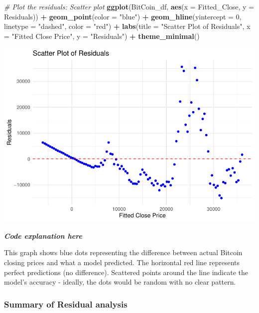 \documentclass[
]{book}
\newenvironment{Shaded}{\begin{snugshade}}{\end{snugshade}}
\newcommand{\AttributeTok}[1]{\textcolor[rgb]{0.13,0.29,0.53}{#1}}
\newcommand{\CommentTok}[1]{\textcolor[rgb]{0.56,0.35,0.01}{\textit{#1}}}
\newcommand{\DecValTok}[1]{\textcolor[rgb]{0.00,0.00,0.81}{#1}}
\newcommand{\FunctionTok}[1]{\textcolor[rgb]{0.13,0.29,0.53}{\textbf{#1}}}
\newcommand{\NormalTok}[1]{#1}
\newcommand{\SpecialCharTok}[1]{\textcolor[rgb]{0.81,0.36,0.00}{\textbf{#1}}}
\newcommand{\StringTok}[1]{\textcolor[rgb]{0.31,0.60,0.02}{#1}}
\begin{document}
\begin{Shaded}
\begin{Highlighting}[]
\CommentTok{\# Plot the residuals: Scatter plot}
\FunctionTok{ggplot}\NormalTok{(BitCoin\_df, }\FunctionTok{aes}\NormalTok{(}\AttributeTok{x =}\NormalTok{ Fitted\_Close, }\AttributeTok{y =}\NormalTok{ Residuals)) }\SpecialCharTok{+}
  \FunctionTok{geom\_point}\NormalTok{(}\AttributeTok{color =} \StringTok{"blue"}\NormalTok{) }\SpecialCharTok{+}
  \FunctionTok{geom\_hline}\NormalTok{(}\AttributeTok{yintercept =} \DecValTok{0}\NormalTok{, }\AttributeTok{linetype =} \StringTok{"dashed"}\NormalTok{, }\AttributeTok{color =} \StringTok{"red"}\NormalTok{) }\SpecialCharTok{+}
  \FunctionTok{labs}\NormalTok{(}\AttributeTok{title =} \StringTok{"Scatter Plot of Residuals"}\NormalTok{,}
       \AttributeTok{x =} \StringTok{"Fitted Close Price"}\NormalTok{,}
       \AttributeTok{y =} \StringTok{"Residuals"}\NormalTok{) }\SpecialCharTok{+}
  \FunctionTok{theme\_minimal}\NormalTok{()}
\end{Highlighting}
\end{Shaded}

\includegraphics{bookdown-demo_files/figure-latex/unnamed-chunk-21-1.pdf}

\emph{\textbf{Code explanation here}}

This graph shows blue dots representing the difference between actual Bitcoin closing prices and what a model predicted. The horizontal red line represents perfect predictions (no difference). Scattered points around the line indicate the model's accuracy - ideally, the dots would be random with no clear pattern.

\subsubsection{Summary of Residual analysis}\label{summary-of-residual-analysis}
\end{document}
